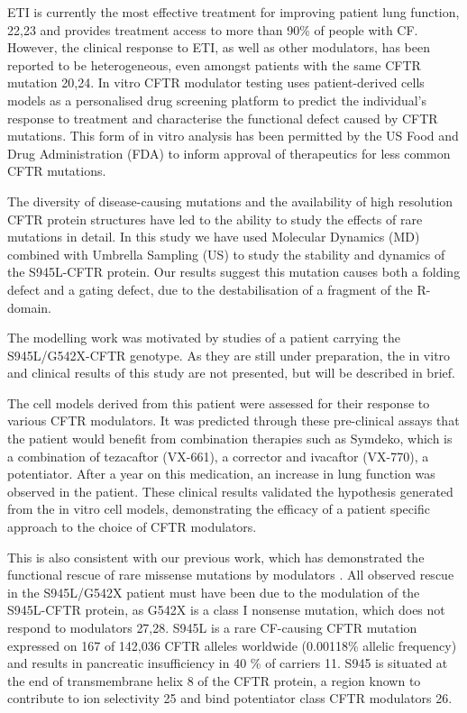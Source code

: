 ETI is currently the most effective treatment for improving patient lung function, \cite{rowe2017,keating2018}22,23 and provides treatment access to more than 90\% of people with CF. However, the clinical response to ETI, as well as other modulators, has been reported to be heterogeneous, even amongst patients with the same CFTR mutation \cite{wainwright2015, boyle2014}20,24. In vitro CFTR modulator testing uses patient-derived cells models as a personalised drug screening platform to predict the individual’s response to treatment and characterise the functional defect caused by CFTR mutations. This form of in vitro analysis has been permitted by the US Food and Drug Administration (FDA) to inform approval of therapeutics for less common CFTR mutations. 

The diversity of disease-causing mutations and the availability of high resolution CFTR protein structures have led to the ability to study the effects of rare mutations in detail. In this study we have used Molecular Dynamics (MD) combined with Umbrella Sampling (US) to study the stability and dynamics of the S945L-CFTR protein. Our results suggest this mutation causes both a folding defect and a gating defect, due to the destabilisation of a fragment of the R-domain. 

The modelling work was motivated by studies of a patient carrying the S945L/G542X-CFTR genotype. As they are still under preparation, the in vitro and clinical results of this study are not presented, but will be described in brief.

The cell models derived from this patient were assessed for their response to various CFTR modulators. It was predicted through these pre-clinical assays that the patient would benefit from combination therapies such as Symdeko, which is a combination of tezacaftor (VX-661), a corrector and ivacaftor (VX-770), a potentiator. After a year on this medication, an increase in lung function was observed in the patient. These clinical results validated the hypothesis generated from the in vitro cell models, demonstrating the efficacy of a patient specific approach to the choice of CFTR modulators.

This is also consistent with our previous work, which has demonstrated the functional rescue of rare missense mutations by modulators . All observed rescue in the S945L/G542X patient must have been due to the modulation of the S945L-CFTR protein, as G542X is a class I nonsense mutation, which does not respond to modulators  \cite{hamosh1992, valley2019}27,28. S945L is a rare CF-causing CFTR mutation expressed on 167 of 142,036 CFTR alleles worldwide (0.00118\% allelic frequency) and results in pancreatic insufficiency in 40 \% of carriers 11. S945 is situated at the end of transmembrane helix 8 of the CFTR protein, a region known to contribute to ion selectivity \cite{negoda2019}25 and bind potentiator class CFTR modulators \cite{liu2019}26. 

